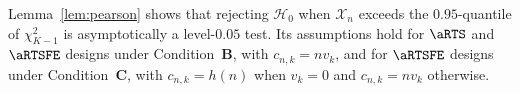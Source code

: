 \begin{remark}\label{rem:test_level}
Lemma~\ref{lem:pearson} shows that rejecting $\mathcal{H}_0$ when $\mathcal{X}_n$
exceeds the $0.95$-quantile of $\chi^2_{K-1}$ is asymptotically a level-$0.05$
test. Its assumptions hold for $\aRTS$ and $\aRTSFE$ designs under Condition~\textbf{B}, with
$c_{n,k}=nv_k$, and for $\aRTSFE$ designs under Condition~\textbf{C}, with $c_{n,k}=h(n)$ when
$v_k=0$ and $c_{n,k}=nv_k$ otherwise.
\end{remark}
